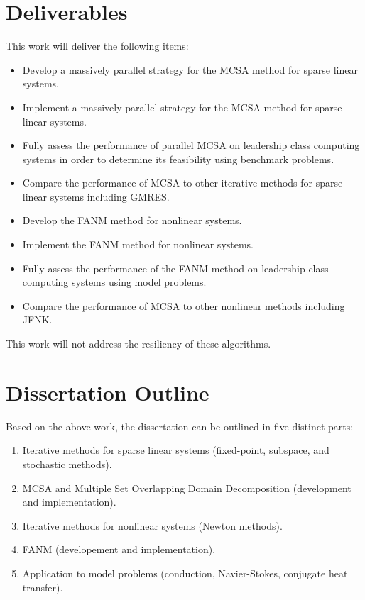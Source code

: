 \documentclass[letterpaper,12pt]{article}
\begin{document}
\section{Deliverables}

This work will deliver the following items:

\begin{itemize}
\item Develop a massively parallel strategy for the MCSA method for
  sparse linear systems.
\item Implement a massively parallel strategy for the MCSA method for
  sparse linear systems.
\item Fully assess the performance of parallel MCSA on leadership class
  computing systems in order to determine its feasibility using
  benchmark problems.
\item Compare the performance of MCSA to other iterative methods for
  sparse linear systems including GMRES.
\item Develop the FANM method for nonlinear systems.
\item Implement the FANM method for nonlinear systems.
\item Fully assess the performance of the FANM method on leadership
  class computing systems using model problems.
\item Compare the performance of MCSA to other nonlinear methods
  including JFNK.
\end{itemize}

This work will not address the resiliency of these algorithms.

\section{Dissertation Outline}

Based on the above work, the dissertation can be outlined in five
distinct parts:

\begin{enumerate}
\item Iterative methods for sparse linear systems (fixed-point,
  subspace, and stochastic methods).
\item MCSA and Multiple Set Overlapping Domain Decomposition
  (development and implementation).
\item Iterative methods for nonlinear systems (Newton methods).
\item FANM (developement and implementation).
\item Application to model problems (conduction, Navier-Stokes,
  conjugate heat transfer).
\end{enumerate}
\end{document}
